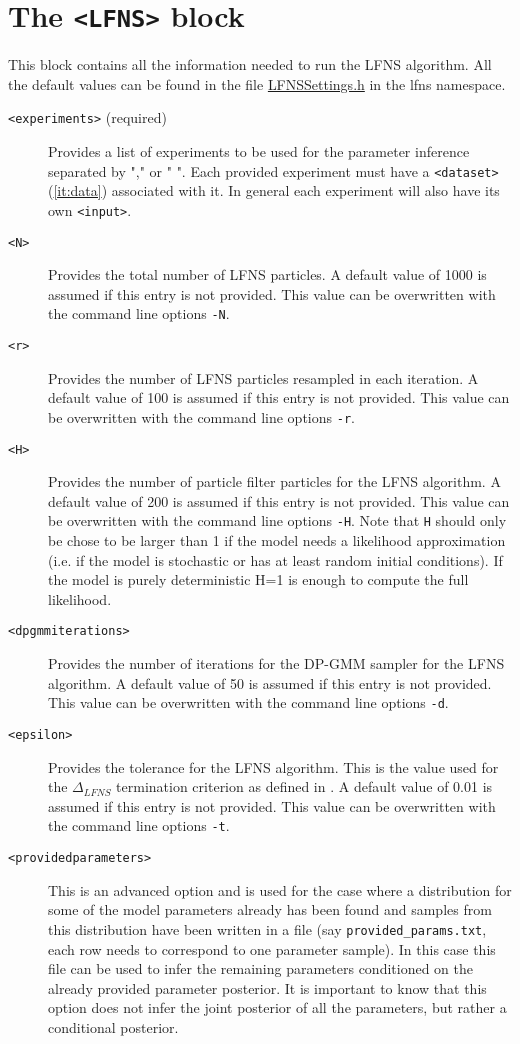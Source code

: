 \documentclass[11pt]{article} %
\begin{document}
\section{The \texttt{<LFNS>} block}
This block contains all the information needed to run the LFNS algorithm. All the default values can be found in the file \href{https://github.com/Mijan/LFNS/blob/publishable/src/LFNS/LFNSSettings.h}{LFNSSettings.h} in the lfns namespace. 
\begin{description}
\item[\texttt{<experiments>} (required)] Provides a list of experiments to be used for the parameter inference separated by "," or " ". Each provided experiment must have a \texttt{<dataset>} (\ref{it:data}) associated with it. In general each experiment will also have its own \texttt{<input>}. 
\item[\texttt{<N>}] Provides the total number of LFNS particles. A default value of 1000 is assumed if this entry is not provided. This value can be overwritten with the command line options \texttt{-N}.   
\item[\texttt{<r>}] Provides the number of LFNS particles resampled in each iteration. A default value of 100 is assumed if this entry is not provided. This value can be overwritten with the command line options \texttt{-r}.   
\item[\texttt{<H>}] Provides the number of particle filter particles for the LFNS algorithm. A default value of 200 is assumed if this entry is not provided. This value can be overwritten with the command line options \texttt{-H}. Note that \texttt{H} should only be chose to be larger than 1 if the model needs a likelihood approximation (i.e. if the model is stochastic or has at least random initial conditions). If the model is purely deterministic H=1 is enough to compute the full likelihood.   
\item[\texttt{<dpgmmiterations>}] Provides the number of iterations for the DP-GMM sampler for the LFNS algorithm. A default value of 50 is assumed if this entry is not provided. This value can be overwritten with the command line options \texttt{-d}.   
\item[\texttt{<epsilon>}] Provides the tolerance for the LFNS algorithm. This is the value used for the $\Delta_{LFNS}$ termination criterion as defined in \cite{mikelson2019likelihood}. A default value of 0.01 is assumed if this entry is not provided. This value can be overwritten with the command line options \texttt{-t}.   
\item[\texttt{<providedparameters>}] This is an advanced option and is used for the case where a distribution for some of the model parameters already has been found and samples from this distribution have been written in a file (say \texttt{provided\_params.txt}, each row needs to correspond to one parameter sample). In this case this file can be used to infer the remaining parameters conditioned on the already provided parameter posterior. It is important to know that this option does not infer the joint posterior of all the parameters, but rather a conditional posterior. 

\end{description}
\end{document}
